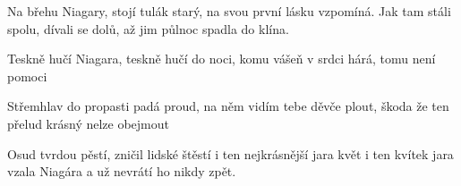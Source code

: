 
\beginverse{}
Na břehu Niagary, stojí tulák starý,
na svou první lásku vzpomíná.
Jak tam stáli spolu, dívali se dolů,
až jim půlnoc spadla do klína.
\endverse{}

\beginchorus{}
Teskně hučí Niagara, teskně hučí do noci,
\lrep{} komu vášeň v srdci hárá, tomu není pomoci \rrep{}
\endchorus{}

\beginverse{}
Střemhlav do propasti padá proud,
na něm vidím tebe děvče plout,
\lrep{} škoda že ten přelud krásný nelze obejmout \rrep{}
\endverse{}

\beginverse{}
Osud tvrdou pěstí, zničil lidské štěstí
i ten nejkrásnější jara květ
i ten kvítek jara vzala Niagára
a už nevrátí ho nikdy zpět.
\endverse{}

\beginchorus{}

\endchorus{}

\endsong{}
